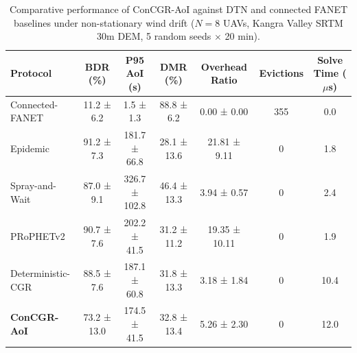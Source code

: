 \begin{table}[t]
\centering
\caption{Comparative performance of ConCGR-AoI against DTN and connected FANET baselines under non-stationary wind drift ($N=8$ UAVs, Kangra Valley SRTM 30m DEM, 5 random seeds $\times$ 20 min).}
\label{tab:real_benchmark_results}
\begin{tabular}{lcccccc}
\toprule
\textbf{Protocol} & \textbf{BDR (\%)} & \textbf{P95 AoI (s)} & \textbf{DMR (\%)} & \textbf{Overhead Ratio} & \textbf{Evictions} & \textbf{Solve Time ($\mu$s)} \\
\midrule
Connected-FANET & 11.2 ± 6.2 & 1.5 ± 1.3 & 88.8 ± 6.2 & 0.00 ± 0.00 & 355 & 0.0 \\
Epidemic & 91.2 ± 7.3 & 181.7 ± 66.8 & 28.1 ± 13.6 & 21.81 ± 9.11 & 0 & 1.8 \\
Spray-and-Wait & 87.0 ± 9.1 & 326.7 ± 102.8 & 46.4 ± 13.3 & 3.94 ± 0.57 & 0 & 2.4 \\
PRoPHETv2 & 90.7 ± 7.6 & 202.2 ± 41.5 & 31.2 ± 11.2 & 19.35 ± 10.11 & 0 & 1.9 \\
Deterministic-CGR & 88.5 ± 7.6 & 187.1 ± 60.8 & 31.8 ± 13.3 & 3.18 ± 1.84 & 0 & 10.4 \\
\textbf{ConCGR-AoI} & 73.2 ± 13.0 & 174.5 ± 41.5 & 32.8 ± 13.4 & 5.26 ± 2.30 & 0 & 12.0 \\
\bottomrule
\end{tabular}
\end{table}
